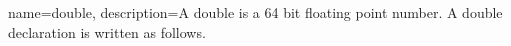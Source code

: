 
{
      name=double,
      description={A double is a 64 bit floating point number.
      A double declaration is written as follows.
      }
     }
